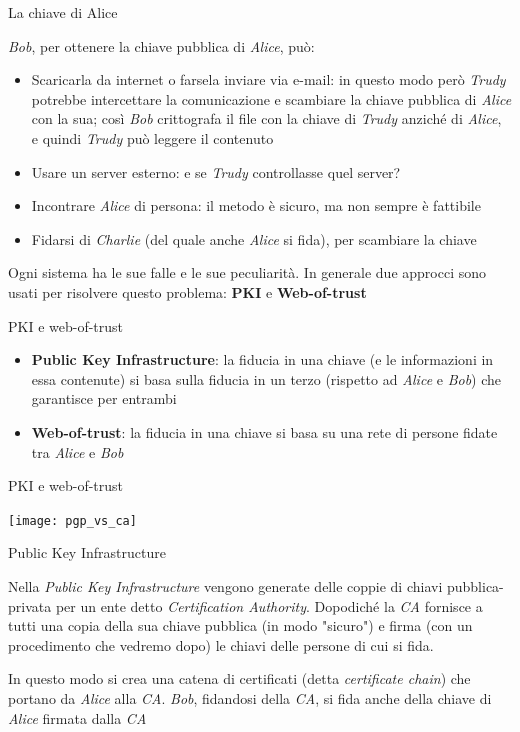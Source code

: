\documentclass[10pt]{beamer}
\begin{document}
\begin{frame}{La chiave di Alice}

\textit{Bob}, per ottenere la chiave pubblica di \textit{Alice}, può:

\begin{itemize}
\item Scaricarla da internet o farsela inviare via e-mail: in questo modo però \textit{Trudy} potrebbe intercettare la comunicazione e scambiare la chiave pubblica di \textit{Alice} con la sua; così \textit{Bob} crittografa il file con la chiave di \textit{Trudy} anziché di \textit{Alice}, e quindi \textit{Trudy} può leggere il contenuto
\item Usare un server esterno: e se \textit{Trudy} controllasse quel server?
\item Incontrare \textit{Alice} di persona: il metodo è sicuro, ma non sempre è fattibile
\item Fidarsi di \textit{Charlie} (del quale anche \textit{Alice} si fida), per scambiare la chiave
\end{itemize}

Ogni sistema ha le sue falle e le sue peculiarità. In generale due approcci sono usati per risolvere questo problema: \textbf{PKI} e \textbf{Web-of-trust}

\end{frame}

\begin{frame}{PKI e web-of-trust}

\begin{itemize}
\item \textbf{Public Key Infrastructure}: la fiducia in una chiave (e le informazioni in essa contenute) si basa sulla fiducia in un terzo (rispetto ad \textit{Alice} e \textit{Bob}) che garantisce per entrambi
\item \textbf{Web-of-trust}: la fiducia in una chiave si basa su una rete di persone fidate tra \textit{Alice} e \textit{Bob}
\end{itemize}

\end{frame}

\begin{frame}{PKI e web-of-trust}

\texttt{[image: pgp\_vs\_ca]}

\end{frame}

\begin{frame}{Public Key Infrastructure}

Nella \textit{Public Key Infrastructure} vengono generate delle coppie di chiavi pubblica-privata per un ente detto \textit{Certification Authority}. Dopodiché la \textit{CA} fornisce a tutti una copia della sua chiave pubblica (in modo "sicuro") e firma (con un procedimento che vedremo dopo) le chiavi delle persone di cui si fida.

In questo modo si crea una catena di certificati (detta \textit{certificate chain}) che portano da \textit{Alice} alla \textit{CA}. \textit{Bob}, fidandosi della \textit{CA}, si fida anche della chiave di \textit{Alice} firmata dalla \textit{CA}

\end{frame}
\end{document}
